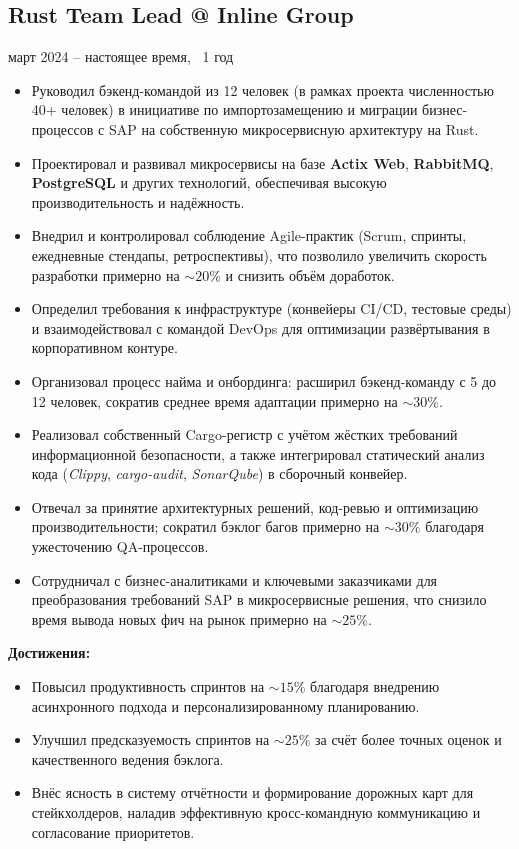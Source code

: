 \documentclass[a4paper,12pt]{article}
\begin{document}
\subsection*{Rust Team Lead @ Inline Group}
\quad март 2024 – настоящее время, ~1 год
\begin{itemize}[leftmargin=15pt]
    \item Руководил бэкенд-командой из 12 человек (в рамках проекта численностью 40+ человек) в инициативе по импортозамещению и миграции бизнес-процессов с SAP на собственную микросервисную архитектуру на Rust.
    \item Проектировал и развивал микросервисы на базе \textbf{Actix Web}, \textbf{RabbitMQ}, \textbf{PostgreSQL} и других технологий, обеспечивая высокую производительность и надёжность.
    \item Внедрил и контролировал соблюдение Agile-практик (Scrum, спринты, ежедневные стендапы, ретроспективы), что позволило увеличить скорость разработки примерно на \(\sim 20\%\) и снизить объём доработок.
    \item Определил требования к инфраструктуре (конвейеры CI/CD, тестовые среды) и взаимодействовал с командой DevOps для оптимизации развёртывания в корпоративном контуре.
    \item Организовал процесс найма и онбординга: расширил бэкенд-команду с 5 до 12 человек, сократив среднее время адаптации примерно на \(\sim 30\%\).
    \item Реализовал собственный Cargo-регистр с учётом жёстких требований информационной безопасности, а также интегрировал статический анализ кода (\textit{Clippy}, \textit{cargo-audit}, \textit{SonarQube}) в сборочный конвейер.
    \item Отвечал за принятие архитектурных решений, код-ревью и оптимизацию производительности; сократил бэклог багов примерно на \(\sim 30\%\) благодаря ужесточению QA-процессов.
    \item Сотрудничал с бизнес-аналитиками и ключевыми заказчиками для преобразования требований SAP в микросервисные решения, что снизило время вывода новых фич на рынок примерно на \(\sim 25\%\).
\end{itemize}

\textbf{Достижения:}
\begin{itemize}[leftmargin=15pt]
    \item Повысил продуктивность спринтов на \(\sim 15\%\) благодаря внедрению асинхронного подхода и персонализированному планированию.
    \item Улучшил предсказуемость спринтов на \(\sim 25\%\) за счёт более точных оценок и качественного ведения бэклога.
    \item Внёс ясность в систему отчётности и формирование дорожных карт для стейкхолдеров, наладив эффективную кросс-командную коммуникацию и согласование приоритетов.
\end{itemize}
\end{document}
